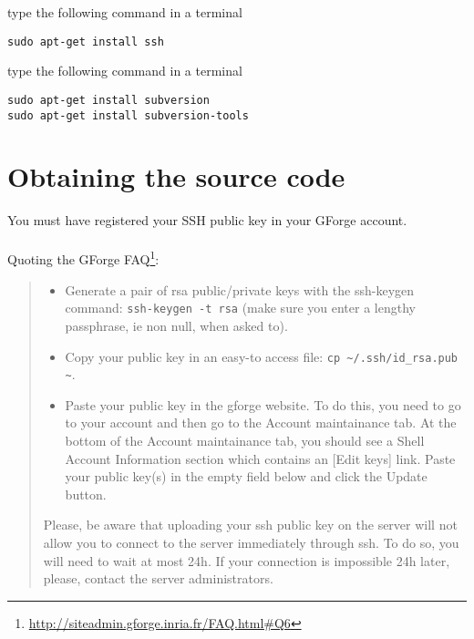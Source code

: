 \begin{list}{}{}
\item [\textbf{SSH\footnote{Secure Shell}:}] type the following command in a terminal
\begin{verbatim}
sudo apt-get install ssh
\end{verbatim}


\item [\textbf{SVN\footnote{Subversion}:}] type the following command in a terminal
\begin{verbatim}
sudo apt-get install subversion
sudo apt-get install subversion-tools
\end{verbatim}


\end{list}

\section{Obtaining the source code}
You must have registered your SSH public key in your GForge account.

\paragraph{}
Quoting the GForge FAQ\footnote{\href{http://siteadmin.gforge.inria.fr/FAQ.html\#Q6}{http://siteadmin.gforge.inria.fr/FAQ.html\#Q6}}:
\begin{quote}
\begin{itemize}
\item Generate a pair of rsa public/private keys with the ssh-keygen command: \verb=ssh-keygen -t rsa= (make sure you enter a lengthy passphrase, ie non null, when asked to).\\
\item Copy your public key in an easy-to access file: \verb=cp ~/.ssh/id_rsa.pub ~=.\\
\item Paste your public key in the gforge website. To do this, you need to go to your account and then go to the Account maintainance tab. At the bottom of the Account maintainance tab, you should see a Shell Account Information section which contains an [Edit keys] link. Paste your public key(s) in the empty field below and click the Update button.\\
\end{itemize}
Please, be aware that uploading your ssh public key on the server will not allow you to connect to the server immediately through ssh. To do so, you will need to wait at most 24h. If your connection is impossible 24h later, please, contact the server administrators.
\end{quote}

